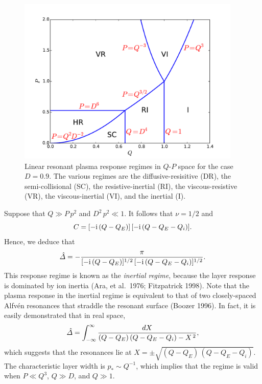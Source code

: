 \documentclass[notitlepage,12pt]{article}
\begin{document}
\begin{figure}[t]
\centerline{\includegraphics[width=0.95\textwidth]{RegimeI.pdf}}
\caption{Linear resonant plasma response regimes in $Q$-$P$ space for the case $D=0.9$. The various regimes are
the diffusive-resisitive (DR), the semi-collisional (SC), the resistive-inertial (RI), the viscous-resistive (VR), the viscous-inertial
(VI), and the inertial (I).}\label{f1}
\end{figure}

Suppose that $Q\gg P\,p^2$ and $D^2\,p^2 \ll 1$. It follows that $\nu=1/2$ and
\begin{equation}
C = [-{\rm i}\,(Q-Q_E)]\,[-{\rm i}\,(Q-Q_E-Q_i)].
\end{equation}
Hence, we deduce that
\begin{equation}
\hat{\mit\Delta} = -\frac{\pi}{[-{\rm i}\,(Q-Q_E)]^{1/2}\,[-{\rm i}\,(Q-Q_E-Q_i)]^{1/2}}.
\end{equation}
This response regime is known as the {\em inertial regime}, because the layer response is dominated by
 ion inertia (Ara, et al.\ 1976; Fitzpatrick 1998). Note that the plasma response in the inertial regime is
 equivalent to that of two closely-spaced Alfv\'{e}n resonances that straddle the resonant surface (Boozer 1996). 
 In fact, it is easily demonstrated that in real space,
 \begin{equation}
 \hat{\mit\Delta} = \int_{-\infty}^\infty \frac{dX}{(Q-Q_E)\,(Q-Q_E-Q_i)-X^{\,2}},
 \end{equation}
 which suggests that the resonances lie at $X=\pm \sqrt{(Q-Q_E)\,(Q-Q_E-Q_i)}$. 
 The characteristic layer width is $p_\ast \sim Q^{-1}$,
which implies that the regime is valid when $P\ll Q^3$, $Q\gg D$, and $Q\gg 1$. 
\end{document}
